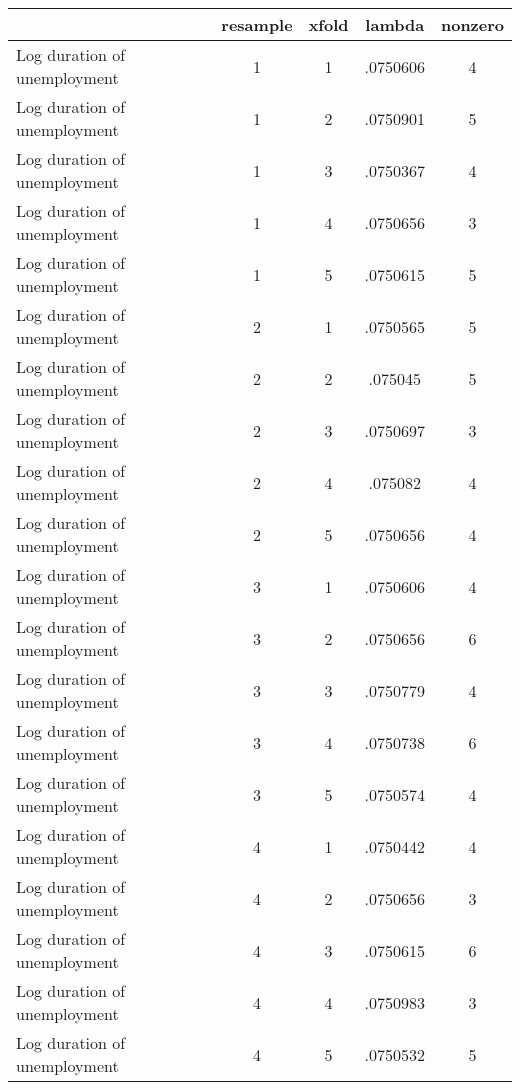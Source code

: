\begin{tabular}{l*{4}{c}}
\hline\hline
                    &    resample&       xfold&      lambda&     nonzero\\
\hline
Log duration of unemployment&           1&           1&    .0750606&           4\\
Log duration of unemployment&           1&           2&    .0750901&           5\\
Log duration of unemployment&           1&           3&    .0750367&           4\\
Log duration of unemployment&           1&           4&    .0750656&           3\\
Log duration of unemployment&           1&           5&    .0750615&           5\\
Log duration of unemployment&           2&           1&    .0750565&           5\\
Log duration of unemployment&           2&           2&     .075045&           5\\
Log duration of unemployment&           2&           3&    .0750697&           3\\
Log duration of unemployment&           2&           4&     .075082&           4\\
Log duration of unemployment&           2&           5&    .0750656&           4\\
Log duration of unemployment&           3&           1&    .0750606&           4\\
Log duration of unemployment&           3&           2&    .0750656&           6\\
Log duration of unemployment&           3&           3&    .0750779&           4\\
Log duration of unemployment&           3&           4&    .0750738&           6\\
Log duration of unemployment&           3&           5&    .0750574&           4\\
Log duration of unemployment&           4&           1&    .0750442&           4\\
Log duration of unemployment&           4&           2&    .0750656&           3\\
Log duration of unemployment&           4&           3&    .0750615&           6\\
Log duration of unemployment&           4&           4&    .0750983&           3\\
Log duration of unemployment&           4&           5&    .0750532&           5\\

\end{tabular}
